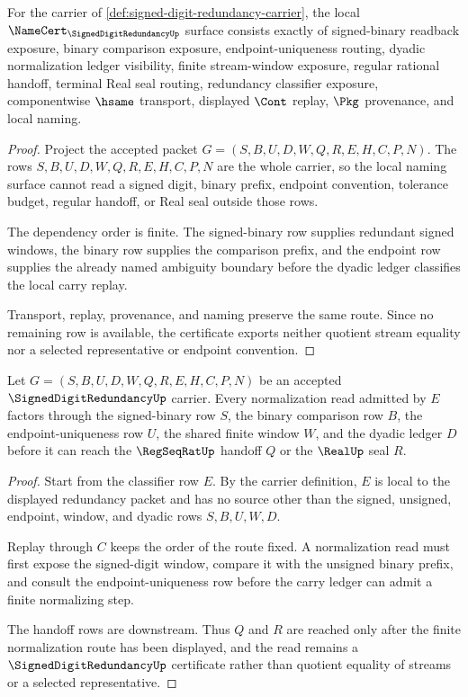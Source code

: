 \begin{theorem}
\label{thm:signed-digit-redundancy-namecert-obligations}
For the carrier of \autoref{def:signed-digit-redundancy-carrier}, the local $\NameCert_{\SignedDigitRedundancyUp}$ surface consists exactly of signed-binary readback exposure, binary comparison exposure, endpoint-uniqueness routing, dyadic normalization ledger visibility, finite stream-window exposure, regular rational handoff, terminal Real seal routing, redundancy classifier exposure, componentwise $\hsame$ transport, displayed $\Cont$ replay, $\Pkg$ provenance, and local naming.
\end{theorem}
\begin{proof}
Project the accepted packet $G=(S,B,U,D,W,Q,R,E,H,C,P,N)$. The rows $S,B,U,D,W,Q,R,E,H,C,P,N$ are the whole carrier, so the local naming surface cannot read a signed digit, binary prefix, endpoint convention, tolerance budget, regular handoff, or Real seal outside those rows.

The dependency order is finite. The signed-binary row supplies redundant signed windows, the binary row supplies the comparison prefix, and the endpoint row supplies the already named ambiguity boundary before the dyadic ledger classifies the local carry replay.

Transport, replay, provenance, and naming preserve the same route. Since no remaining row is available, the certificate exports neither quotient stream equality nor a selected representative or endpoint convention.
\end{proof}

\begin{theorem}
\label{thm:signed-digit-redundancy-normalization-nonescape}
Let $G=(S,B,U,D,W,Q,R,E,H,C,P,N)$ be an accepted $\SignedDigitRedundancyUp$ carrier. Every normalization read admitted by $E$ factors through the signed-binary row $S$, the binary comparison row $B$, the endpoint-uniqueness row $U$, the shared finite window $W$, and the dyadic ledger $D$ before it can reach the $\RegSeqRatUp$ handoff $Q$ or the $\RealUp$ seal $R$.
\end{theorem}
\begin{proof}
Start from the classifier row $E$. By the carrier definition, $E$ is local to the displayed redundancy packet and has no source other than the signed, unsigned, endpoint, window, and dyadic rows $S,B,U,W,D$.

Replay through $C$ keeps the order of the route fixed. A normalization read must first expose the signed-digit window, compare it with the unsigned binary prefix, and consult the endpoint-uniqueness row before the carry ledger can admit a finite normalizing step.

The handoff rows are downstream. Thus $Q$ and $R$ are reached only after the finite normalization route has been displayed, and the read remains a $\SignedDigitRedundancyUp$ certificate rather than quotient equality of streams or a selected representative.
\end{proof}

